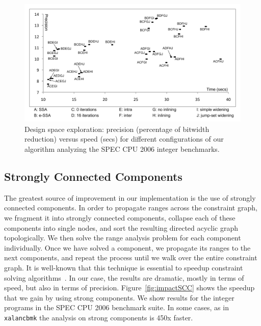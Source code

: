 \documentclass[times]{speauth}
\begin{document}
\begin{figure}[t!]
\begin{center}
\includegraphics[width=\textwidth]{images/space}
\end{center}
\caption{\label{fig:space}
Design space exploration: precision (percentage of bitwidth reduction)
versus speed (secs) for different configurations of our algorithm analyzing
the SPEC CPU 2006 integer benchmarks.}
\end{figure}

\subsection{Strongly Connected Components}
\label{sub:sccs}

The greatest source of improvement in our implementation is the use of strongly
connected components.
In order to propagate ranges across the constraint graph, we fragment it
into strongly connected components, collapse each of these components into
single nodes, and sort the resulting directed acyclic graph topologically.
We then solve the range analysis problem for each component individually.
Once we have solved a component, we propagate its ranges to the next
components, and repeat the process until we walk over the entire constraint
graph.
It is well-known that this technique is essential to speedup constraint solving
algorithms~\cite[Sec 6.3]{Nielson99}.
In our case, the results are dramatic, mostly in terms of speed, but also in
terms of precision.
Figure~\ref{fig:impactSCC} shows the speedup that we gain by using strong
components.
We show results for the integer programs in the SPEC CPU 2006 benchmark suite.
In some cases, as in \texttt{xalancbmk} the analysis on strong components is
450x faster.
\end{document}

